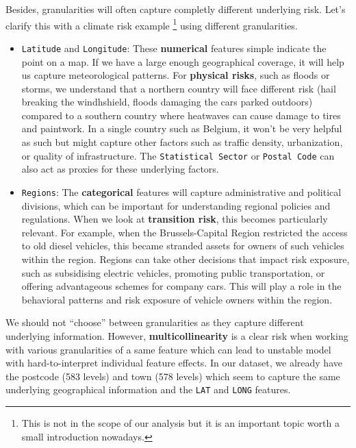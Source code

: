 \documentclass[
  english,
  11pt,
]{article}
\begin{document}
Besides, granularities will often capture completly different underlying
risk. Let's clarify this with a climate risk example \footnote{This is
  not in the scope of our analysis but it is an important topic worth a
  small introduction nowadays.} using different granularities.

\begin{itemize}
\item
  \texttt{Latitude} and \texttt{Longitude}: These \textbf{numerical}
  features simple indicate the point on a map. If we have a large enough
  geographical coverage, it will help us capture meteorological
  patterns. For \textbf{physical risks}, such as floods or storms, we
  understand that a northern country will face different risk (hail
  breaking the windhshield, floods damaging the cars parked outdoors)
  compared to a southern country where heatwaves can cause damage to
  tires and paintwork. In a single country such as Belgium, it won't be
  very helpful as such but might capture other factors such as traffic
  density, urbanization, or quality of infrastructure. The
  \texttt{Statistical\ Sector} or \texttt{Postal\ Code} can also act as
  proxies for these underlying factors.
\item
  \texttt{Regions}: The \textbf{categorical} features will capture
  administrative and political divisions, which can be important for
  understanding regional policies and regulations. When we look at
  \textbf{transition risk}, this becomes particularly relevant. For
  example, when the Brussels-Capital Region restricted the access to old
  diesel vehicles, this became stranded assets for owners of such
  vehicles within the region. Regions can take other decisions that
  impact risk exposure, such as subsidising electric vehicles, promoting
  public transportation, or offering advantageous schemes for company
  cars. This will play a role in the behavioral patterns and risk
  exposure of vehicle owners within the region.
\end{itemize}

We should not ``choose'' between granularities as they capture different
underlying information. However, \textbf{multicollinearity} is a clear
risk when working with various granularities of a same feature which can
lead to unstable model with hard-to-interpret individual feature
effects. In our dataset, we already have the postcode (583 levels) and
town (578 levels) which seem to capture the same underlying geographical
information and the \texttt{LAT} and \texttt{LONG} features.
\end{document}
